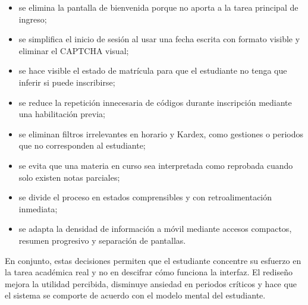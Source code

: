 \begin{itemize}
  \item se elimina la pantalla de bienvenida porque no aporta a la tarea principal de ingreso;
  \item se simplifica el inicio de sesión al usar una fecha escrita con formato visible y eliminar el CAPTCHA visual;
  \item se hace visible el estado de matrícula para que el estudiante no tenga que inferir si puede inscribirse;
  \item se reduce la repetición innecesaria de códigos durante inscripción mediante una habilitación previa;
  \item se eliminan filtros irrelevantes en horario y Kardex, como gestiones o periodos que no corresponden al estudiante;
  \item se evita que una materia en curso sea interpretada como reprobada cuando solo existen notas parciales;
  \item se divide el proceso en estados comprensibles y con retroalimentación inmediata;
  \item se adapta la densidad de información a móvil mediante accesos compactos, resumen progresivo y separación de pantallas.
\end{itemize}

En conjunto, estas decisiones permiten que el estudiante concentre su esfuerzo en la tarea académica real y no en descifrar cómo funciona la interfaz. El rediseño mejora la utilidad percibida, disminuye ansiedad en periodos críticos y hace que el sistema se comporte de acuerdo con el modelo mental del estudiante.
